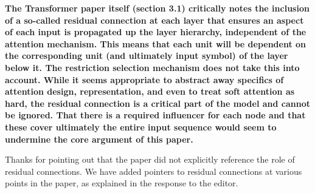 \documentclass[11pt,a4paper]{article}
\newcommand\response[1]{{\color{blue}#1}}
\newcommand\original[1]{\textbf{#1}}
\begin{document}
\original{The Transformer paper itself (section 3.1) critically notes the
inclusion of a so-called residual connection
at each layer that ensures an aspect of each input is propagated up the
layer
hierarchy, independent of the attention mechanism. This means that
each unit will be dependent on the corresponding unit (and ultimately
input symbol) of the layer below it. The restriction selection
mechanism does not take this into account. While it seems appropriate to
abstract away specifics of attention design, representation, and even
to treat soft attention as hard, the residual connection is a critical part
of the model and cannot be ignored. That there is a required
influencer for each node and that these cover ultimately the entire
input sequence would seem to undermine the core argument of this paper.}

\response{Thanks for pointing out that the paper did not explicitly reference the role of residual connections. We have added pointers to residual connections at various points in the paper, as explained in the response to the editor.}

\end{document}
